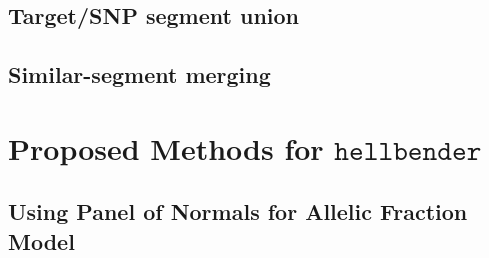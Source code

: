 \documentclass[nofootinbib,amssymb,amsmath]{revtex4}
\begin{document}
\subsection{Target/SNP segment union} \label{targetsnp-segment-union}

\subsection{Similar-segment merging} \label{similar-segment-merging}


\section{Proposed Methods for $\texttt{hellbender}$} \label{proposed-methods-for-texttthellbender}

\subsection{Using Panel of Normals for Allelic Fraction Model} \label{allelic-PoN}
\end{document}
